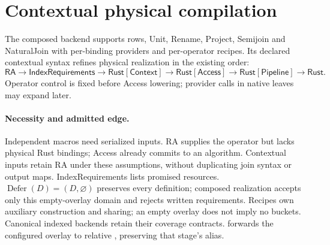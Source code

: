 \section{Contextual physical compilation}
\label{sec:block-implementation}
The composed backend supports  rows, Unit, Rename, Project, Semijoin
and NaturalJoin with per-binding providers and per-operator recipes. Its declared
contextual syntax refines physical realization in the existing order:
\[
 \mathsf{RA}\longrightarrow\mathsf{IndexRequirements}
 \longrightarrow\mathsf{Rust}[\mathsf{Context}]
 \longrightarrow\mathsf{Rust}[\mathsf{Access}]
 \longrightarrow\mathsf{Rust}[\mathsf{Pipeline}]\longrightarrow\mathsf{Rust}.
\]
Operator control is fixed before Access lowering; provider calls in native
leaves may expand later.

\paragraph{Necessity and admitted edge.}
Independent macros need serialized inputs. RA supplies the operator but lacks
physical Rust bindings; Access already commits to an algorithm. Contextual inputs
retain RA under these assumptions, without duplicating join syntax or output maps.
IndexRequirements lists promised resources. $\operatorname{Defer}(D)=(D,\varnothing)$
preserves every definition; composed realization accepts only this empty-overlay
domain and rejects written requirements. Recipes own auxiliary construction and
sharing; an empty overlay does not imply no buckets. Canonical indexed backends
retain their coverage contracts.  forwards the configured
overlay to relative , preserving that stage's alias.

